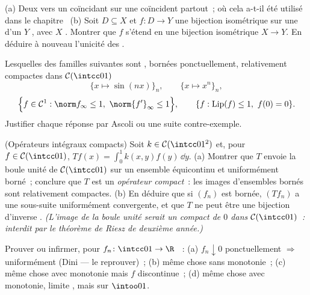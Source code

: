 \begin{exercise}[$\star\star$]\label{exo:b3:complete:5}
(a) Deux  vers un 
coïncidant sur une  coïncident partout~; où cela
a-t-il été utilisé dans le chapitre~
(b) Soit $D \subseteq X$  et $f \colon D \to Y$ une
bijection isométrique sur une  d'un $Y$ ,
avec $X$ . Montrer que $f$ s'étend en une bijection
isométrique $X \to Y$. En déduire à nouveau l'unicité des
.
\end{exercise}

\begin{exercise}[$\star\star$]\label{exo:b3:complete:6}
Lesquelles des familles suivantes sont , bornées
ponctuellement, relativement compactes dans $\mathcal
C(\intcc01)$~
\[
\{x \mapsto \sin(nx)\}_{n},\qquad
\{x \mapsto x^n\}_n,
\]
\[
\Bigl\{f \in \mathcal C^1 : \norm f_\infty \leq 1,\
\norm{f'}_\infty \leq 1\Bigr\},\qquad
\{f : \operatorname{Lip}(f)\leq 1,\ f(0) = 0\}.
\]
Justifier chaque réponse par Ascoli ou une suite
contre-exemple.
\end{exercise}

\begin{exercise}[$\star\star\star$]\label{exo:b3:complete:7}
(Opérateurs intégraux compacts) Soit $k \in \mathcal
C(\intcc01^2)$ et, pour $f \in \mathcal C(\intcc01)$, $Tf(x)
= \int_0^1k(x,y)f(y)\,\dd y$.
(a) Montrer que $T$ envoie la boule unité de $\mathcal
C(\intcc01)$ sur un ensemble équicontinu et uniformément
borné~; conclure que $T$ est un \emph{opérateur compact}~: les
images d'ensembles bornés sont relativement compactes.
(b) En déduire que si $(f_n)$ est bornée, $(Tf_n)$ a une
sous-suite uniformément convergente, et que $T$ ne peut être
une bijection d'inverse . \emph{(L'image de la boule
unité serait un \omterm{def:b3:topology:topology}{voisinage} compact de $0$ dans $\mathcal
C(\intcc01)$~: interdit par le théorème de Riesz de deuxième
année.)}
\end{exercise}

\begin{exercise}[$\star\star$]\label{exo:b3:complete:8}
Prouver ou infirmer, pour $f_n \colon \intcc01 \to \R$
~:
(a) $f_n \downarrow 0$ ponctuellement $\Rightarrow$
uniformément (Dini --- le reprouver)~; (b) même chose sans
monotonie~; (c) même chose avec monotonie mais $f$
discontinue~; (d) même chose avec monotonie, limite ,
mais sur $\intoo01$.
\end{exercise}

